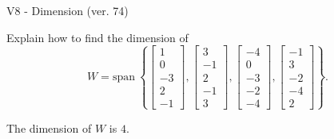 \begin{exercise}
  \begin{exerciseTitle}V8 - Dimension (ver. 74)\end{exerciseTitle}
  \begin{exerciseStatement}
    Explain how to find the dimension of 
\[W=\mathrm{span}\ \left\{\left[\begin{array}{r}
1 \\
0 \\
-3 \\
2 \\
-1
\end{array}\right] , \left[\begin{array}{r}
3 \\
-1 \\
2 \\
-1 \\
3
\end{array}\right] , \left[\begin{array}{r}
-4 \\
0 \\
-3 \\
-2 \\
-4
\end{array}\right] , \left[\begin{array}{r}
-1 \\
3 \\
-2 \\
-4 \\
2
\end{array}\right]\right\}.\]



  \end{exerciseStatement}
  \begin{exerciseAnswer}
   The dimension of \(W\) is  \(4\).
  


  \end{exerciseAnswer}
\end{exercise}